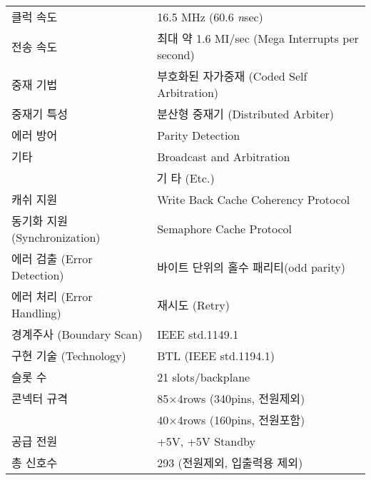 \begin{table}[htbp]
\begin{center}
\begin{tabular}{|l l|}
      클럭 속도 & 16.5 MHz (60.6 {\it n\/}sec) \\
      전송 속도 & 최대 약 1.6 MI/sec (Mega Interrupts per second) \\
      중재 기법 & 부호화된 자가중재 (Coded Self Arbitration) \\
      중재기 특성 & 분산형 중재기 (Distributed Arbiter) \\
      에러 방어 & Parity Detection \\
      기타 & Broadcast and Arbitration \\ \hline
    \multicolumn{2}{|c|}{기 타 (Etc.)} \\ \hline
      캐쉬 지원 & Write Back Cache Coherency Protocol \\
      동기화 지원 (Synchronization) & Semaphore Cache Protocol \\
      에러 검출 (Error Detection) & 바이트 단위의 홀수 패리티(odd parity) \\
      에러 처리 (Error Handling) & 재시도 (Retry) \\
      경계주사 (Boundary Scan) & IEEE std.1149.1 \\
      구현 기술 (Technology) & BTL (IEEE std.1194.1) \\
      슬롯 수 & 21 slots/backplane \\
      콘넥터 규격 & 85$\times$4rows (340pins, 전원제외)\\
                  & 40$\times$4rows (160pins, 전원포함)\\
      공급 전원 & +5V, +5V Standby \\
      총 신호수 & 293 (전원제외, 입출력용 제외) \\ \hline
  \end{tabular}
\endgroup
  \end{center}
\end{table}
%
